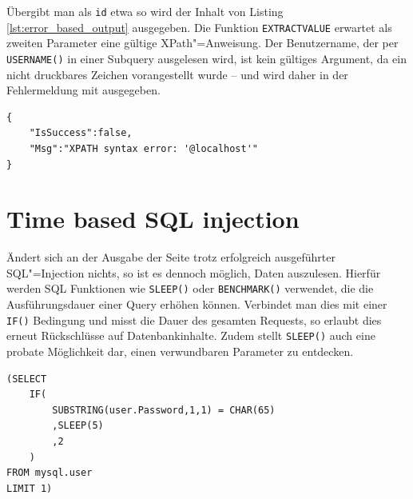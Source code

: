Übergibt man als \texttt{id} etwa
so wird der Inhalt von Listing \ref{lst:error_based_output} ausgegeben. Die Funktion \texttt{EXTRACTVALUE} erwartet als zweiten Parameter eine gültige XPath"=Anweisung. Der Benutzername, der per \texttt{USERNAME()} in einer Subquery ausgelesen wird, ist kein gültiges Argument, da ein nicht druckbares Zeichen vorangestellt wurde -- und wird daher in der Fehlermeldung mit ausgegeben.

\begin{listing}
\begin{margincap}
\begin{verbatim}
{
    "IsSuccess":false,
    "Msg":"XPATH syntax error: '@localhost'"
}
\end{verbatim}
\caption[Ausgabe einer Error-based Injection]{Ausgabe der \emph{Error based} SQL"=Injection. In der Fehlermeldung ist das Resultat der Subquery zu sehen, in diesem Fall der Rückgabewert der Funktion \texttt{USERNAME().}}
\label{lst:error_based_output}
\end{margincap}
\end{listing}


\section{Time based SQL injection}

Ändert sich an der Ausgabe der Seite trotz erfolgreich ausgeführter SQL"=Injection nichts, so ist es dennoch möglich, Daten auszulesen. Hierfür werden SQL Funktionen wie \texttt{SLEEP()} oder \texttt{BENCHMARK()} verwendet, die die Ausführungsdauer einer Query erhöhen können. Verbindet man dies mit einer \texttt{IF()} Bedingung und misst die Dauer des gesamten Requests, so erlaubt dies erneut Rückschlüsse auf Datenbankinhalte. Zudem stellt  \texttt{SLEEP()} auch eine probate Möglichkeit dar, einen verwundbaren Parameter zu entdecken.

\begin{listing}[H]
\begin{margincap}
\begin{verbatim}
(SELECT
    IF(
        SUBSTRING(user.Password,1,1) = CHAR(65)
        ,SLEEP(5)
        ,2
    )
FROM mysql.user
LIMIT 1)
\end{verbatim}
\caption[Payload einer Time-based Injection]{Diese Query vergleicht ein einzelnes Zeichen einer Zeichenkette mit einem bestimmten ASCII"=Code. Liefert der Vergleich \texttt{true}, so wird fünf Sekunden gewartet.}
\label{lst:time_based}
\end{margincap}
\end{listing}

